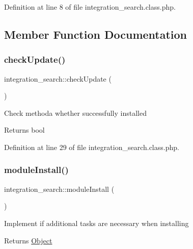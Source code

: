 Definition at line 8 of file integration\+\_\+search.\+class.\+php.



\subsection{Member Function Documentation}
\mbox{\label{classintegration__search_a998b55202e7ea75389e2ab8f640b374d}} 
\subsubsection{\texorpdfstring{check\+Update()}{checkUpdate()}}
{\footnotesize\ttfamily integration\+\_\+search\+::check\+Update (\begin{DoxyParamCaption}{ }\end{DoxyParamCaption})}

Check methoda whether successfully installed

\begin{DoxyReturn}{Returns}
bool 
\end{DoxyReturn}


Definition at line 29 of file integration\+\_\+search.\+class.\+php.

\mbox{\label{classintegration__search_a04d168bf88a4f95b6f4bd24854538d87}} 
\subsubsection{\texorpdfstring{module\+Install()}{moduleInstall()}}
{\footnotesize\ttfamily integration\+\_\+search\+::module\+Install (\begin{DoxyParamCaption}{ }\end{DoxyParamCaption})}

Implement if additional tasks are necessary when installing

\begin{DoxyReturn}{Returns}
\hyperlink{classObject}{Object} 
\end{DoxyReturn}


